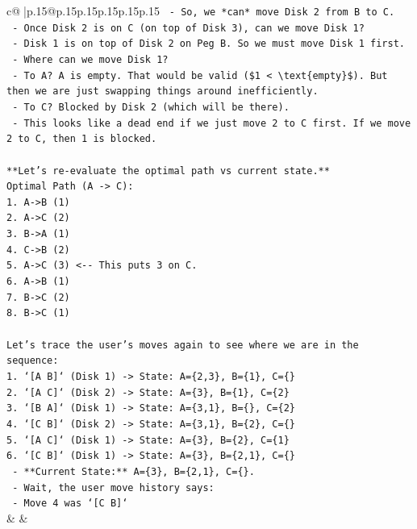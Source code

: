 \documentclass{article}
\begin{document}
{\begin{supertabular}{c@{$\;$}|p{.15\linewidth}@{}p{.15\linewidth}p{.15\linewidth}p{.15\linewidth}p{.15\linewidth}p{.15\linewidth}}
{{{\texttt{  {-} So, we *can* move Disk 2 from B to C.} \\
\texttt{  {-} Once Disk 2 is on C (on top of Disk 3), can we move Disk 1?} \\
\texttt{  {-} Disk 1 is on top of Disk 2 on Peg B. So we must move Disk 1 first.} \\
\texttt{  {-} Where can we move Disk 1?} \\
\texttt{    {-} To A? A is empty. That would be valid (\$1 < \textbackslash{}text\{empty\}\$). But then we are just swapping things around inefficiently.} \\
\texttt{    {-} To C? Blocked by Disk 2 (which will be there).} \\
\texttt{  {-} This looks like a dead end if we just move 2 to C first. If we move 2 to C, then 1 is blocked.} \\
\\ 
\texttt{**Let's re{-}evaluate the optimal path vs current state.**} \\
\texttt{Optimal Path (A {-}> C):} \\
\texttt{1. A{-}>B (1)} \\
\texttt{2. A{-}>C (2)} \\
\texttt{3. B{-}>A (1)} \\
\texttt{4. C{-}>B (2)} \\
\texttt{5. A{-}>C (3)  <{-}{-} This puts 3 on C.} \\
\texttt{6. A{-}>B (1)} \\
\texttt{7. B{-}>C (2)} \\
\texttt{8. B{-}>C (1)} \\
\\ 
\texttt{Let's trace the user's moves again to see where we are in the sequence:} \\
\texttt{1. `{[}A B{]}` (Disk 1) {-}> State: A=\{2,3\}, B=\{1\}, C=\{\}} \\
\texttt{2. `{[}A C{]}` (Disk 2) {-}> State: A=\{3\}, B=\{1\}, C=\{2\}} \\
\texttt{3. `{[}B A{]}` (Disk 1) {-}> State: A=\{3,1\}, B=\{\}, C=\{2\}} \\
\texttt{4. `{[}C B{]}` (Disk 2) {-}> State: A=\{3,1\}, B=\{2\}, C=\{\}} \\
\texttt{5. `{[}A C{]}` (Disk 1) {-}> State: A=\{3\}, B=\{2\}, C=\{1\}} \\
\texttt{6. `{[}C B{]}` (Disk 1) {-}> State: A=\{3\}, B=\{2,1\}, C=\{\}} \\
\texttt{   {-} **Current State:** A=\{3\}, B=\{2,1\}, C=\{\}.} \\
\texttt{   {-} Wait, the user move history says:} \\
\texttt{     {-} Move 4 was `{[}C B{]}`} \\
            }
        }
    }
    & & \\ \\


\end{supertabular}}
\end{document}
